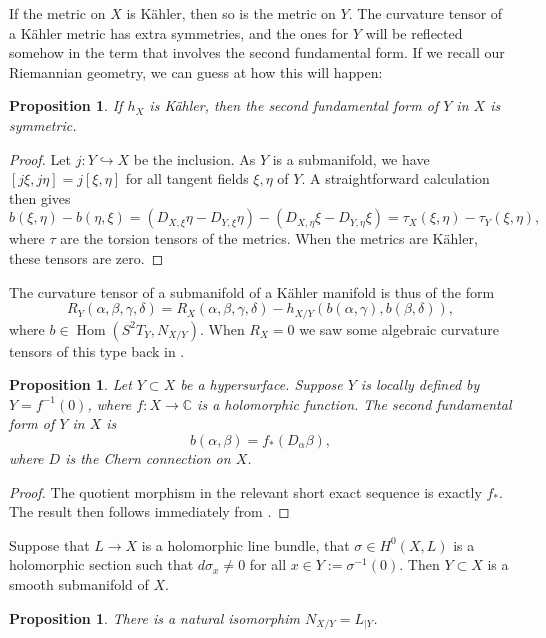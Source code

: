 \documentclass[10pt,a4paper]{article}
\newtheorem{prop}[theo]{Proposition}
\newtheorem*{proof}{Proof}
\newcommand{\kk}[1]{\mathbb{#1}}
\DeclareMathOperator{\Hom}{Hom}
\begin{document}
If the metric on $X$ is K\"ahler, then so is the metric on $Y$. The curvature tensor of a K\"ahler metric has extra symmetries, and the ones for $Y$ will be reflected somehow in the term that involves the second fundamental form. If we recall our Riemannian geometry, we can guess at how this will happen:

\begin{prop}
If $h_X$ is K\"ahler, then the second fundamental form of $Y$ in $X$ is symmetric.
\end{prop}

\begin{proof}
Let $j : Y \hookrightarrow X$ be the inclusion. As $Y$ is a submanifold, we have $[j\xi,j\eta] = j[\xi,\eta]$ for all tangent fields $\xi,\eta$ of $Y$. A straightforward calculation then gives
\[
b(\xi,\eta) - b(\eta,\xi)
= (D_{X,\xi}\eta - D_{Y,\xi}\eta)
- (D_{X,\eta}\xi - D_{Y,\eta}\xi)
= \tau_X(\xi,\eta) - \tau_Y(\xi,\eta),
\]
where $\tau$ are the torsion tensors of the metrics. When the metrics are K\"ahler, these tensors are zero.
\end{proof}

The curvature tensor of a submanifold of a K\"ahler manifold is thus of the form
\[
R_Y(\alpha,\beta,\gamma,\delta)
= R_X(\alpha,\beta,\gamma,\delta)
- h_{X/Y}(b(\alpha,\gamma), b(\beta,\delta)),
\]
where $b \in \Hom(S^2 T_Y, N_{X/Y})$. When $R_X = 0$ we saw some algebraic curvature tensors of this type back in .



\begin{prop}
Let $Y \subset X$ be a hypersurface. Suppose $Y$ is locally defined by $Y = f^{-1}(0)$, where $f : X \to \kk C$ is a holomorphic function. The second fundamental form of $Y$ in $X$ is
\[
b(\alpha,\beta) = f_*(D_\alpha \beta),
\]
where $D$ is the Chern connection on $X$.
\end{prop}

\begin{proof}
The quotient morphism in the relevant short exact sequence is exactly $f_*$. The result then follows immediately from .
\end{proof}


Suppose that $L \to X$ is a holomorphic line bundle, that $\sigma \in H^0(X,L)$ is a holomorphic section such that $d\sigma_x \not= 0$ for all $x \in Y := \sigma^{-1}(0)$. Then $Y \subset X$ is a smooth submanifold of $X$.

\begin{prop}
There is a natural isomorphim $N_{X/Y} = L_{|Y}$.
\end{prop}
\end{document}
